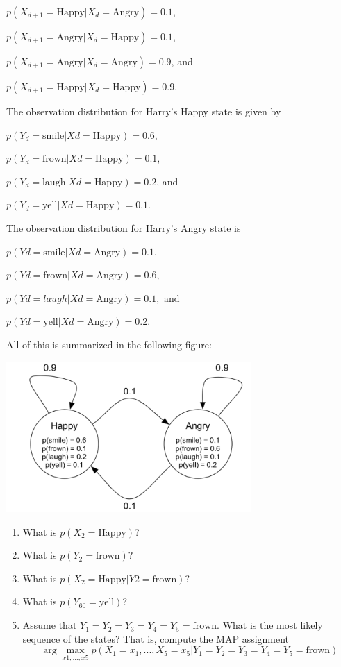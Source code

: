 \documentclass[11pt]{article}
\begin{document}
\begin{enumerate}
$p(X_{d+1} = \text{Happy} | X_d = \text{Angry}) = 0.1$, 

$p(X_{d+1} = \text{Angry} | X_d = \text{Happy}) = 0.1$, 

$p(X_{d+1} = \text{Angry} | X_d =\text{Angry}) = 0.9$, and 

$p(X_{d+1} = \text{Happy} | X_d = \text{Happy}) = 0.9$.

\noindent The observation distribution for Harry’s Happy state is given by 

$p(Y_d = \text{smile} | Xd = \text{Happy}) = 0.6$, 

$p(Y_d = \text{frown} | Xd = \text{Happy}) = 0.1$,  

$p(Y_d = \text{laugh} | Xd = \text{Happy}) = 0.2$,  and 

$p(Y_d = \text{yell} | Xd = \text{Happy}) = 0.1$. 

\noindent The observation distribution for Harry’s Angry state is 

$p(Yd = \text{smile} | Xd = \text{Angry}) = 0.1$, 

$p(Yd =\text{frown} | Xd = \text{Angry}) = 0.6$, 

$p(Yd = laugh | Xd =\text{Angry})=0.1,$ and 

$p(Yd =\text{yell} | Xd =\text{Angry})=0.2.$

\noindent All of this is summarized in the following figure:

\begin{center}
\includegraphics[width=0.7\textwidth]{figure}
\end{center}

\begin{enumerate}
\item What is $p(X_2 = \text{Happy})$?
\item What is $p(Y_2 = \text{frown})$?
\item What is $p(X_2 = \text{Happy} | Y2 = \text{frown})$?
\item What is $p(Y_{60} = \text{yell})$?
\item Assume that $Y_1 =Y_2 =Y_3 =Y_4 =Y_5 =\text{frown}$. What is the most likely sequence of the states? That is, compute the MAP assignment $$\arg \max_{x1,\ldots,x5} p(X_1 = x_1,...,X_5 =x_5 |Y_1 =Y_2 =Y_3 =Y_4 =Y_5 =\text{frown})$$
\end{enumerate}


\end{enumerate}
\end{document}
